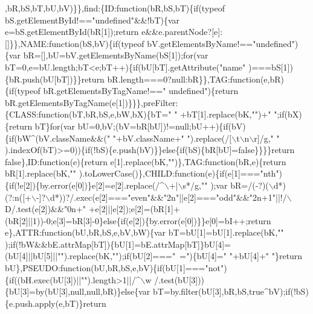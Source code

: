 \begin{DoxyCode}
{      ,bR,bS,bT,bU,bV)\}\},find:\{ID:function(bR,bS,bT)\{if(typeof bS.getElementById!=="}undefined\textcolor{stringliteral}{"&&!bT)\{var
       e=bS.getElementById(bR[1]);return e&&e.parentNode?[e]:[]\}\},NAME:function(bS,bV)\{if(typeof bV.getElementsByName!=="}undefined\textcolor{stringliteral}{")\{var
       bR=[],bU=bV.getElementsByName(bS[1]);for(var bT=0,e=bU.length;bT<e;bT++)\{if(bU[bT].getAttribute("}name\textcolor{stringliteral}{"
      )===bS[1])\{bR.push(bU[bT])\}\}return bR.length===0?null:bR\}\},TAG:function(e,bR)\{if(typeof bR.getElementsByTagName!=="}
      undefined\textcolor{stringliteral}{")\{return bR.getElementsByTagName(e[1])\}\}\},preFilter:\{CLASS:function(bT,bR,bS,e,bW,bX)\{bT="} \textcolor{stringliteral}{"
      +bT[1].replace(bK,"}\textcolor{stringliteral}{")+"} \textcolor{stringliteral}{";if(bX)\{return bT\}for(var bU=0,bV;(bV=bR[bU])!=null;bU++)\{if(bV)\{if(bW^(bV.className&&("} \textcolor{stringliteral}{
      "+bV.className+"} \textcolor{stringliteral}{").replace(/[\(\backslash\)t\(\backslash\)n\(\backslash\)r]/g,"} \textcolor{stringliteral}{"
      ).indexOf(bT)>=0))\{if(!bS)\{e.push(bV)\}\}else\{if(bS)\{bR[bU]=false\}\}\}\}return false\},ID:function(e)\{return e[1].replace(bK,"}\textcolor{stringliteral}{")\},TAG:function(bR,e)\{return bR[1].replace(bK,"}\textcolor{stringliteral}{"
      ).toLowerCase()\},CHILD:function(e)\{if(e[1]==="}nth\textcolor{stringliteral}{")\{if(!e[2])\{by.error(e[0])\}e[2]=e[2].replace(/^\(\backslash\)+|\(\backslash\)s*/g,"}\textcolor{stringliteral}{"
      );var bR=/(-?)(\(\backslash\)d*)(?:n([+\(\backslash\)-]?\(\backslash\)d*))?/.exec(e[2]==="}even\textcolor{stringliteral}{"&&"}2n\textcolor{stringliteral}{"||e[2]==="}odd\textcolor{stringliteral}{"&&"}2n+1\textcolor{stringliteral}{"||!/\(\backslash\)D/.test(e[2])&&"}0n+\textcolor{stringliteral}{"
      +e[2]||e[2]);e[2]=(bR[1]+(bR[2]||1))-0;e[3]=bR[3]-0\}else\{if(e[2])\{by.error(e[0])\}\}e[0]=bI++;return
       e\},ATTR:function(bU,bR,bS,e,bV,bW)\{var bT=bU[1]=bU[1].replace(bK,"}\textcolor{stringliteral}{"
      );if(!bW&&bE.attrMap[bT])\{bU[1]=bE.attrMap[bT]\}bU[4]=(bU[4]||bU[5]||"}\textcolor{stringliteral}{").replace(bK,"}\textcolor{stringliteral}{");if(bU[2]==="}~=\textcolor{stringliteral}{")\{bU[4]="} \textcolor{stringliteral}{"+bU[4]+"} \textcolor{stringliteral}{"\}return
       bU\},PSEUDO:function(bU,bR,bS,e,bV)\{if(bU[1]==="}not\textcolor{stringliteral}{")\{if((bH.exec(bU[3])||"}\textcolor{stringliteral}{").length>1||/^\(\backslash\)w
      /.test(bU[3]))\{bU[3]=by(bU[3],null,null,bR)\}else\{var bT=by.filter(bU[3],bR,bS,true^bV);if(!bS)\{e.push.apply(e,bT)\}return
}
\end{DoxyCode}
